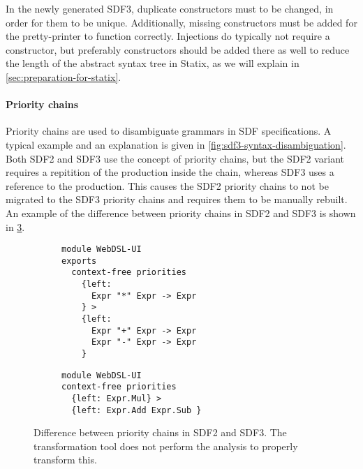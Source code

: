       In the newly generated SDF3, duplicate constructors must to be changed, in order for them to be unique. Additionally, missing constructors must be added for the pretty-printer to function correctly. Injections do typically not require a constructor, but preferably constructors should be added there as well to reduce the length of the abstract syntax tree in Statix, as we will explain in \cref{sec:preparation-for-statix}.

      \paragraph{Priority chains} Priority chains are used to disambiguate grammars in SDF specifications. A typical example and an explanation is given in \cref{fig:sdf3-syntax-disambiguation}. Both SDF2 and SDF3 use the concept of priority chains, but the SDF2 variant requires a repitition of the production inside the chain, whereas SDF3 uses a reference to the production. This causes the SDF2 priority chains to not be migrated to the SDF3 priority chains and requires them to be manually rebuilt. An example of the difference between priority chains in SDF2 and SDF3 is shown in \cref{fig:sdf2-sdf3-asc-priority-chains}.

      \begin{figure}
        \begin{subfigure}[b]{0.5\textwidth}
          \begin{verbatim}
module WebDSL-UI
exports
  context-free priorities
    {left:
      Expr "*" Expr -> Expr
    } >
    {left:
      Expr "+" Expr -> Expr
      Expr "-" Expr -> Expr
    }
          \end{verbatim}
          \caption{\label{fig:sdf2-sdf3-asc-priority-chains-sdf2}}
        \end{subfigure}
        \begin{subfigure}[b]{0.5\textwidth}
          \begin{verbatim}
module WebDSL-UI
context-free priorities
  {left: Expr.Mul} >
  {left: Expr.Add Expr.Sub }
          \end{verbatim}
          \caption{\label{fig:sdf2-sdf3-asc-priority-chains-sdf3}}
        \end{subfigure}
        \caption{\label{fig:sdf2-sdf3-asc-priority-chains}Difference between priority chains in SDF2 and SDF3. The transformation tool does not perform the analysis to properly transform this.}
      \end{figure}

